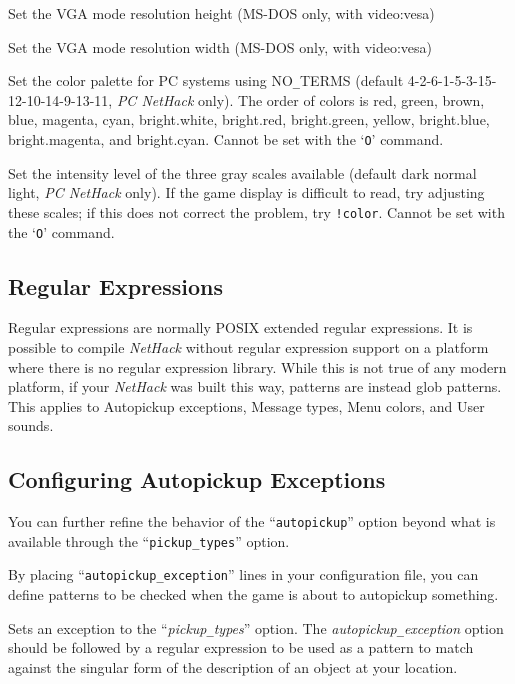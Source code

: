 \item[\ib{video\verb+_+height}]
Set the VGA mode resolution height (MS-DOS only, with video:vesa)
\item[\ib{video\verb+_+width}]
Set the VGA mode resolution width (MS-DOS only, with video:vesa)
\item[\ib{videocolors}]
\begin{sloppypar}
Set the color palette for PC systems using NO\verb+_+TERMS
(default 4-2-6-1-5-3-15-12-10-14-9-13-11, {\it PC\/ NetHack\/} only).
The order of colors is red, green, brown, blue, magenta, cyan,
bright.white, bright.red, bright.green, yellow, bright.blue,
bright.magenta, and bright.cyan.
Cannot be set with the `{\tt O}' command.
\end{sloppypar}
\item[\ib{videoshades}]
Set the intensity level of the three gray scales available
(default dark normal light, {\it PC\/ NetHack\/} only).
If the game display is difficult to read, try adjusting these scales;
if this does not correct the problem, try {\tt !color}.
Cannot be set with the `{\tt O}' command.
\elist

\subsection*{Regular Expressions}

Regular expressions are normally POSIX extended regular expressions. It is
possible to compile {\it NetHack\/} without regular expression support on
a platform where
there is no regular expression library. While this is not true of any modern
platform, if your {\it NetHack\/} was built this way, patterns are instead glob
patterns. This applies to Autopickup exceptions, Message types, Menu colors,
and User sounds.

\subsection*{Configuring Autopickup Exceptions}

You can further refine the behavior of the ``{\tt autopickup}'' option
beyond what is available through the ``{\tt pickup\verb+_+types}'' option.

By placing ``{\tt autopickup\verb+_+exception}'' lines in your configuration
file, you can define patterns to be checked when the game is about to
autopickup something.

\blist{}
\item[\ib{autopickup\verb+_+exception}]
Sets an exception to the ``{\it pickup\verb+_+types}'' option.
The {\it autopickup\verb+_+exception\/} option should be followed by a regular
expression to be used as a pattern to match against the singular form of the
description of an object at your location.

